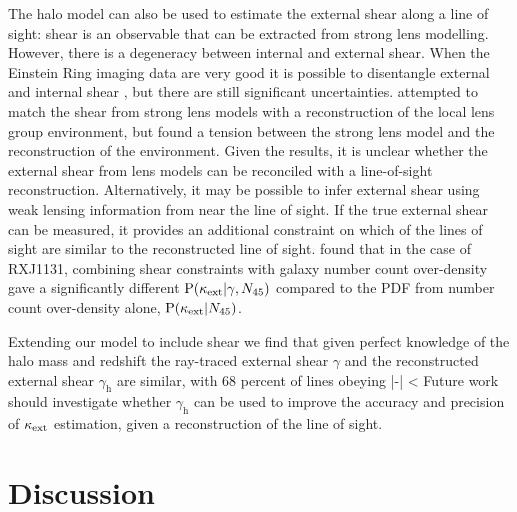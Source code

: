 \documentclass[useAMS,usenatbib,a4paper]{mn2e}
\begin{document}
The halo model can also be used to estimate the external shear along a line of
sight: shear is an observable that can be extracted from strong lens
modelling. However, there is a degeneracy between internal and external shear.
When the Einstein Ring imaging data are very good it is possible to
disentangle external and internal shear \citep[\eg][]{SuyuEtal2010}, but there
are still significant uncertainties. \citet{WongEtal2011} attempted to match
the shear from strong lens models with a reconstruction of the local lens
group environment, but found a tension between the strong lens model and the
reconstruction of the environment. Given the \citet{WongEtal2011} results, it
is unclear whether the external shear from lens models can be reconciled with
a line-of-sight reconstruction. Alternatively, it may be possible  to infer
external shear using weak lensing information from near the line of sight.  If
the true external shear can be measured, it provides an additional constraint
on which of the \MS lines of sight are similar to the reconstructed line of
sight. \citet{SuyuEtal2012} found that in the case of 
RXJ1131, combining shear constraints
with galaxy number count over-density gave a significantly different
${\rm P}(\kappa_{\rm ext}|\gamma,N_{45})$ compared to the PDF from number count
over-density alone, ${\rm P}(\kappa_{\rm ext}|N_{45})$.

Extending our model to include shear we find that given
perfect knowledge of the halo mass and redshift the ray-traced external shear
$\gamma$ and the reconstructed external shear $\gamma_{\mathrm{h}}$  are
similar, with 68 percent of lines obeying
\be
\label{eq:shearineq}
|{\boldmath{\gammax}-}| < 
\ee 
Future work should investigate whether $\gamma_{\mathrm{h}}$ can be used
to improve the accuracy and precision of $\kappa_{\rm ext}$ estimation, given a
reconstruction of the line of sight. 



\section{Discussion}
\label{sec:discuss}
\end{document}
